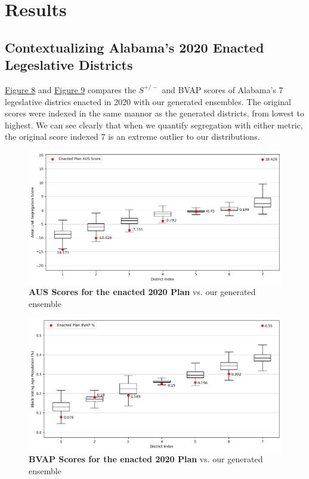 \documentclass{article}
\begin{document}
\pagebreak
\section{Results}\label{results}

\subsection{Contextualizing Alabama's 2020 Enacted Legeslative Districts}


\hyperref[fig 8]{Figure 8} and \hyperref[fig 9]{Figure 9} compares the $S^{+/-}$ and BVAP scores of Alabama's 7 legeslative districs enacted in 2020 with our generated ensembles. The original scores were indexed in the same mannor as the generated districts, from lowest to highest. We can see clearly that when we quantify segregation with either metric, the original score indexed 7 is an extreme outlier to our distributions.      

\begin{figure}[h]\label{fig 8}
    \centering
    \includegraphics[scale=.45]{images/asu_compare.png}
    \caption{\textbf{AUS Scores for the enacted 2020 Plan} vs. our generated ensemble}
\end{figure}

\begin{figure}[h]\label{fig 9}
    \centering
    \includegraphics[scale=.45]{images/bvap_compare.png}
    \caption{\textbf{BVAP Scores for the enacted 2020 Plan} vs. our generated ensemble}
\end{figure}
\end{document}
